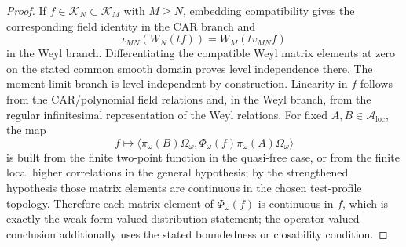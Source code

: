 \documentclass[12pt,a4paper]{article}
\begin{document}
\begin{proof}
If \(f\in\mathcal K_N\subset \mathcal K_M\) with \(M\ge N\), embedding
compatibility gives the corresponding field identity in the CAR branch and
\[
\iota_{MN}(W_N(tf))=W_M(tv_{MN}f)
\]
in the Weyl branch.  Differentiating the compatible Weyl matrix elements at
zero on the stated common smooth domain proves level independence there.
The moment-limit branch is level independent by construction.  Linearity in
\(f\) follows from the CAR/polynomial field relations and, in the Weyl
branch, from the regular infinitesimal representation of the Weyl
relations.
For fixed \(A,B\in\mathcal A_{\mathrm{loc}}\), the map
\[
f\mapsto
\langle\pi_\omega(B)\Omega_\omega,\Phi_\omega(f)
\pi_\omega(A)\Omega_\omega\rangle
\]
is built from the finite two-point function in the quasi-free case, or from the finite local higher correlations in the general hypothesis; by the strengthened hypothesis those matrix elements are continuous in the chosen test-profile topology.
Therefore each matrix element of \(\Phi_\omega(f)\) is continuous in \(f\), which is exactly the weak form-valued distribution statement; the operator-valued conclusion additionally uses the stated boundedness or closability condition. \qedhere
\end{proof}
\end{document}
